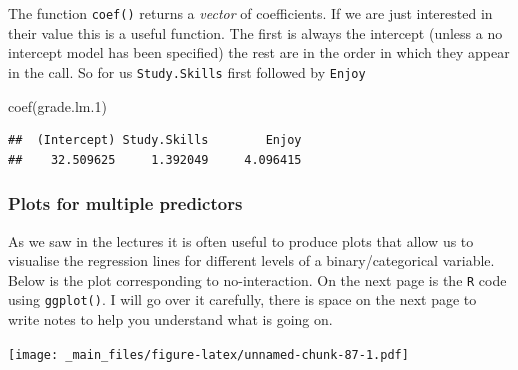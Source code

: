 \documentclass[
]{gitbook}
\newenvironment{Shaded}{\begin{snugshade}}{\end{snugshade}}
\newcommand{\FloatTok}[1]{\textcolor[rgb]{0.00,0.00,0.81}{#1}}
\newcommand{\FunctionTok}[1]{\textcolor[rgb]{0.00,0.00,0.00}{#1}}
\newcommand{\NormalTok}[1]{#1}
\begin{document}
The function \texttt{coef()} returns a \emph{vector} of coefficients. If we are just interested in their value this is a useful function. The first is always the intercept (unless a no intercept model has been specified) the rest are in the order in which they appear in the call. So for us \texttt{Study.Skills} first followed by \texttt{Enjoy}

\begin{Shaded}
\begin{Highlighting}[]
\FunctionTok{coef}\NormalTok{(grade.lm}\FloatTok{.1}\NormalTok{)}
\end{Highlighting}
\end{Shaded}

\begin{verbatim}
##  (Intercept) Study.Skills        Enjoy 
##    32.509625     1.392049     4.096415
\end{verbatim}

\hypertarget{plots-for-multiple-predictors}{%
\subsubsection{Plots for multiple predictors}\label{plots-for-multiple-predictors}}

As we saw in the lectures it is often useful to produce plots that allow us to visualise the regression lines for different levels of a binary/categorical variable. Below is the plot corresponding to no-interaction. On the next page is the \texttt{R} code using \texttt{ggplot()}. I will go over it carefully, there is space on the next page to write notes to help you understand what is going on.


\texttt{[image: \_main\_files/figure-latex/unnamed-chunk-87-1.pdf]}
\end{document}
